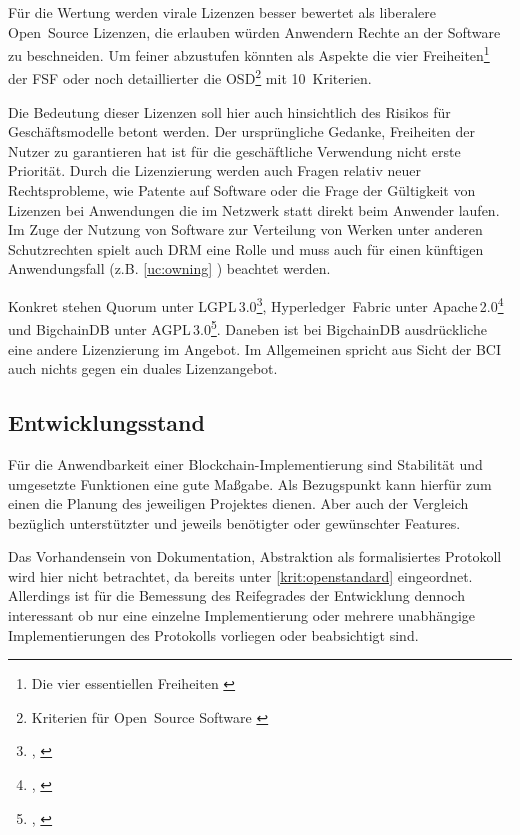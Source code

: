 Für die Wertung werden virale Lizenzen besser bewertet als liberalere Open~Source Lizenzen, die erlauben würden Anwendern Rechte an der Software zu beschneiden.
Um feiner abzustufen könnten als Aspekte die vier Freiheiten\footnote{Die vier essentiellen Freiheiten \autocite{w:fsf-freedoms}} der \gls{FSF}
oder noch detaillierter die \gls{OSD}\footnote{Kriterien für Open~Source Software \autocite{w:iso-osd}} mit 10~Kriterien.

Die Bedeutung dieser Lizenzen soll hier auch hinsichtlich des Risikos für Geschäftsmodelle betont werden.
Der ursprüngliche Gedanke, Freiheiten der Nutzer zu garantieren hat ist für die geschäftliche Verwendung nicht erste Priorität.
Durch die Lizenzierung werden auch Fragen relativ neuer Rechtsprobleme, wie Patente auf Software oder die Frage der Gültigkeit von Lizenzen bei Anwendungen die im Netzwerk statt direkt beim Anwender laufen.
Im Zuge der Nutzung von Software zur Verteilung von Werken unter anderen Schutzrechten spielt auch \gls{DRM} eine Rolle und muss auch für einen künftigen Anwendungsfall (z.B. \ref{uc:owning} ) beachtet werden.

Konkret stehen Quorum unter LGPL\,3.0\footnote{\cite{w:license:lgpl3}, \cite{w:quorum-jpmorgan:github}}, Hyperledger~Fabric unter Apache\,2.0\footnote{\cite{w:license:al2}, \cite{w:hyperledger-fabric:github}} und BigchainDB unter AGPL\,3.0\footnote{\cite{w:license:agpl3}, \cite{w:bigchaindb:github}}. Daneben ist bei BigchainDB ausdrückliche eine andere Lizenzierung im Angebot. Im Allgemeinen spricht aus Sicht der \gls{BCI} auch nichts gegen ein duales Lizenzangebot.

\subsection{Entwicklungsstand}\label{krit:entwicklungsstand}

Für die Anwendbarkeit einer Blockchain-Implementierung sind Stabilität und umgesetzte Funktionen eine gute Maßgabe.
Als Bezugspunkt kann hierfür zum einen die Planung des jeweiligen Projektes dienen.
Aber auch der Vergleich bezüglich unterstützter und jeweils benötigter oder gewünschter Features.

Das Vorhandensein von Dokumentation, Abstraktion als formalisiertes Protokoll wird hier nicht betrachtet, da bereits unter
\ref{krit:openstandard} eingeordnet.
Allerdings ist für die Bemessung des Reifegrades der Entwicklung dennoch interessant ob nur eine einzelne Implementierung oder mehrere unabhängige Implementierungen des Protokolls vorliegen oder beabsichtigt sind.

